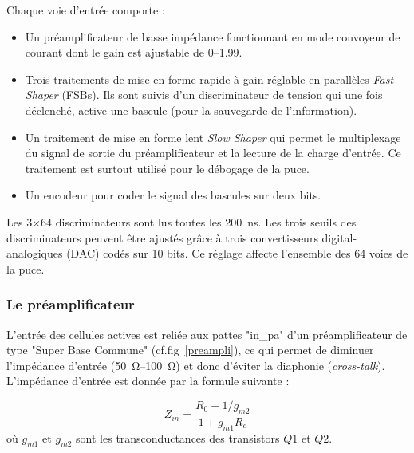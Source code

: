 Chaque voie d'entrée comporte :
\begin{itemize}[label=$\bullet$]
	\item Un préamplificateur de basse impédance fonctionnant en mode convoyeur de courant dont le gain est ajustable de \SIrange{0}{1.99}{}.
	\item Trois traitements de mise en forme rapide à gain réglable en parallèles \textit{Fast Shaper} (FSBs). Ils sont suivis d'un discriminateur de tension qui une fois déclenché, active une bascule (pour la sauvegarde de l'information).
	\item Un traitement de mise en forme lent \textit{Slow Shaper} qui permet le multiplexage du signal de sortie du préamplificateur et la lecture de la charge d'entrée. Ce traitement est surtout utilisé pour le débogage de la puce.
	\item Un encodeur pour coder le signal des bascules sur deux bits.
\end{itemize}

Les \num{3}$\times$\num{64} discriminateurs sont lus toutes les \SI{200}{\nano\second}. Les trois seuils des discriminateurs peuvent être ajustés grâce à trois convertisseurs digital-analogiques (DAC) codés sur \num{10} bits. Ce réglage affecte l'ensemble des \num{64} voies de la puce.

\subsubsection{Le préamplificateur}
L'entrée des cellules actives est reliée aux pattes "in\_pa" d'un préamplificateur de type "Super Base Commune" (cf.fig~\ref{preampli}), ce qui permet de diminuer l'impédance d'entrée (\SIrange{50}{100}{\ohm}) et donc d'éviter la diaphonie (\textit{cross-talk}). L'impédance d'entrée est donnée par la formule suivante :

\begin{equation}
Z_{in}=\frac{R_0+1/g_{m2}}{1+g_{m1}R_c}
\end{equation}
où $g_{m1}$ et $g_{m2}$ sont les transconductances des transistors $Q1$ et $Q2$.

